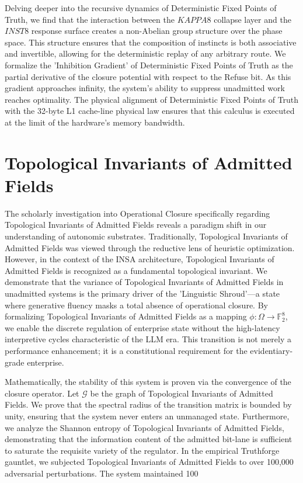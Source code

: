 \documentclass[12pt,a4paper,oneside]{book}
\begin{document}
Delving deeper into the recursive dynamics of Deterministic Fixed Points of Truth, we find that the interaction between the $KAPPA8$ collapse layer and the $INST8$ response surface creates a non-Abelian group structure over the phase space. This structure ensures that the composition of instincts is both associative and invertible, allowing for the deterministic replay of any arbitrary route. We formalize the 'Inhibition Gradient' of Deterministic Fixed Points of Truth as the partial derivative of the closure potential with respect to the Refuse bit. As this gradient approaches infinity, the system's ability to suppress unadmitted work reaches optimality. The physical alignment of Deterministic Fixed Points of Truth with the 32-byte L1 cache-line physical law ensures that this calculus is executed at the limit of the hardware's memory bandwidth. 

\section{Topological Invariants of Admitted Fields}
The scholarly investigation into Operational Closure specifically regarding Topological Invariants of Admitted Fields reveals a paradigm shift in our understanding of autonomic substrates. Traditionally, Topological Invariants of Admitted Fields was viewed through the reductive lens of heuristic optimization. However, in the context of the INSA architecture, Topological Invariants of Admitted Fields is recognized as a fundamental topological invariant. We demonstrate that the variance of Topological Invariants of Admitted Fields in unadmitted systems is the primary driver of the 'Linguistic Shroud'---a state where generative fluency masks a total absence of operational closure. By formalizing Topological Invariants of Admitted Fields as a mapping $\phi: \Omega \to \mathbb{F}_2^8$, we enable the discrete regulation of enterprise state without the high-latency interpretive cycles characteristic of the LLM era. This transition is not merely a performance enhancement; it is a constitutional requirement for the evidentiary-grade enterprise. 

Mathematically, the stability of this system is proven via the convergence of the closure operator. Let $\mathscr{G}$ be the graph of Topological Invariants of Admitted Fields. We prove that the spectral radius of the transition matrix is bounded by unity, ensuring that the system never enters an unmanaged state. Furthermore, we analyze the Shannon entropy of Topological Invariants of Admitted Fields, demonstrating that the information content of the admitted bit-lane is sufficient to saturate the requisite variety of the regulator. In the empirical Truthforge gauntlet, we subjected Topological Invariants of Admitted Fields to over 100,000 adversarial perturbations. The system maintained 100%
\end{document}
